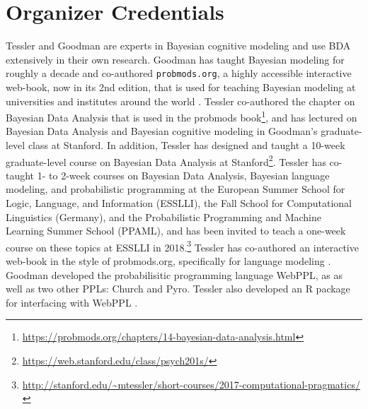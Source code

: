 \documentclass[10pt,letterpaper]{article}
\begin{document}
\section{Organizer Credentials}
Tessler and Goodman are experts in Bayesian cognitive modeling and use BDA extensively in their own research. 
Goodman has taught Bayesian modeling for roughly a decade and co-authored \texttt{probmods.org}, a highly accessible interactive web-book, now in its 2nd edition, that is used for teaching Bayesian modeling at universities and institutes around the world \cite{probmods2}. 
Tessler co-authored the chapter on Bayesian Data Analysis that is used in the probmods book\footnote{\url{https://probmods.org/chapters/14-bayesian-data-analysis.html}}, and has lectured on Bayesian Data Analysis and Bayesian cognitive modeling in Goodman's graduate-level class at Stanford.
In addition, Tessler has designed and taught a 10-week graduate-level course on Bayesian Data Analysis at Stanford\footnote{
\url{https://web.stanford.edu/class/psych201s/}}.
Tessler has co-taught 1- to 2-week courses on Bayesian Data Analysis, Bayesian language modeling, and probabilistic programming at the  European Summer School for Logic, Language, and Information (ESSLLI), the Fall School for Computational Linguistics (Germany), and the Probabilistic Programming and Machine Learning Summer School (PPAML), and has been invited to teach a one-week course on these topics at ESSLLI in 2018.\footnote{\url{http://stanford.edu/~mtessler/short-courses/2017-computational-pragmatics/}}
Tessler has co-authored an interactive web-book in the style of probmods.org, specifically for language modeling \cite{problang}.
Goodman developed the probabilisitic programming language WebPPL, as as well as two other PPLs: Church \cite{church} and Pyro.
Tessler also developed an R package for interfacing with WebPPL .




\setlength{\bibleftmargin}{.125in}
\setlength{\bibindent}{-\bibleftmargin}


\end{document}
